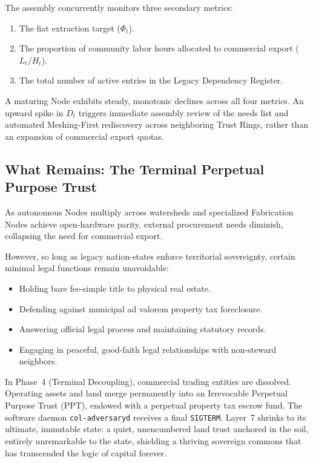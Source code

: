 The assembly concurrently monitors three secondary metrics:
\begin{enumerate}
  \item The fiat extraction target ($\Phi_t$).
  \item The proportion of community labor hours allocated to commercial export ($L_t / H_t$).
  \item The total number of active entries in the Legacy Dependency Register.
\end{enumerate}
A maturing Node exhibits steady, monotonic declines across all four metrics. An upward spike in $D_t$ triggers immediate assembly review of the needs list and automated Meshing-First rediscovery across neighboring Trust Rings, rather than an expansion of commercial export quotas.

\subsection{What Remains: The Terminal Perpetual Purpose Trust}

As autonomous Nodes multiply across watersheds and specialized Fabrication Nodes achieve open-hardware parity, external procurement needs diminish, collapsing the need for commercial export.

However, so long as legacy nation-states enforce territorial sovereignty, certain minimal legal functions remain unavoidable:
\begin{itemize}
  \item Holding bare fee-simple title to physical real estate.
  \item Defending against municipal ad valorem property tax foreclosure.
  \item Answering official legal process and maintaining statutory records.
  \item Engaging in peaceful, good-faith legal relationships with non-steward neighbors.
\end{itemize}
In Phase~4 (Terminal Decoupling), commercial trading entities are dissolved. Operating assets and land merge permanently into an Irrevocable Perpetual Purpose Trust (PPT), endowed with a perpetual property tax escrow fund. The software daemon \texttt{col-adversaryd} receives a final \texttt{SIGTERM}. Layer~7 shrinks to its ultimate, immutable state: a quiet, unencumbered land trust anchored in the soil, entirely unremarkable to the state, shielding a thriving sovereign commons that has transcended the logic of capital forever.


